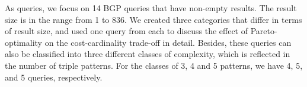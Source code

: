 As queries, we focus on 14 BGP queries that have non-empty results. The result size is in the range from 1 to 836. We created three categories that differ in terms of result size, and used one query from each to discuss the effect of Pareto-optimality on the cost-cardinality trade-off in detail. Besides, these queries can also be classified into three different classes of complexity, which is reflected in the number of triple patterns. For the classes of 3, 4 and 5 patterns, we have 4, 5, and 5 queries, respectively. 





